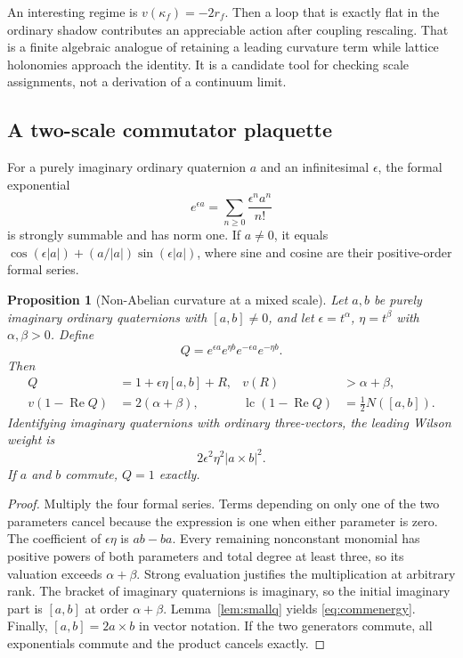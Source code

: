 \documentclass[11pt,oneside]{article}
\numberwithin{equation}{section}
\theoremstyle{plain}
\newtheorem{proposition}[theorem]{Proposition}
\theoremstyle{definition}
\theoremstyle{remark}
\newcommand{\Rea}{\operatorname{Re}}
\newcommand{\lc}{\operatorname{lc}}
\newcommand{\abs}[1]{\left|#1\right|}
\begin{document}
An interesting regime is $v(\kappa_f)=-2r_f$. Then a loop that is exactly flat in the ordinary shadow contributes an appreciable action after coupling rescaling. That is a finite algebraic analogue of retaining a leading curvature term while lattice holonomies approach the identity. It is a candidate tool for checking scale assignments, not a derivation of a continuum limit.

\subsection{A two-scale commutator plaquette}
For a purely imaginary ordinary quaternion $a$ and an infinitesimal $\epsilon$, the formal exponential
\[
 e^{\epsilon a}=\sum_{n\ge0}\frac{\epsilon^n a^n}{n!}
\]
is strongly summable and has norm one. If $a\ne0$, it equals
$\cos(\epsilon|a|)+(a/|a|)\sin(\epsilon|a|)$, where sine and cosine are their positive-order formal series.

\begin{proposition}[Non-Abelian curvature at a mixed scale]\label{prop:plaquette}
Let $a,b$ be purely imaginary ordinary quaternions with $[a,b]\ne0$, and let $\epsilon=t^\alpha$, $\eta=t^\beta$ with $\alpha,\beta>0$. Define
\[
 Q=e^{\epsilon a}e^{\eta b}e^{-\epsilon a}e^{-\eta b}.
\]
Then
\begin{align}
 Q&=1+\epsilon\eta[a,b]+R,
 &v(R)&>\alpha+\beta,\label{eq:commloop}\\
 v(1-\Rea Q)&=2(\alpha+\beta),
 &\lc(1-\Rea Q)&=\tfrac12 N([a,b]).\label{eq:commenergy}
\end{align}
Identifying imaginary quaternions with ordinary three-vectors, the leading Wilson weight is
\[
 2\epsilon^2\eta^2\abs{a\times b}^{2}.
\]
If $a$ and $b$ commute, $Q=1$ exactly.
\end{proposition}
\begin{proof}
Multiply the four formal series. Terms depending on only one of the two parameters cancel because the expression is one when either parameter is zero. The coefficient of $\epsilon\eta$ is $ab-ba$. Every remaining nonconstant monomial has positive powers of both parameters and total degree at least three, so its valuation exceeds $\alpha+\beta$. Strong evaluation justifies the multiplication at arbitrary rank. The bracket of imaginary quaternions is imaginary, so the initial imaginary part is $[a,b]$ at order $\alpha+\beta$. Lemma~\ref{lem:smallq} yields \eqref{eq:commenergy}. Finally, $[a,b]=2a\times b$ in vector notation. If the two generators commute, all exponentials commute and the product cancels exactly.
\end{proof}
\end{document}
